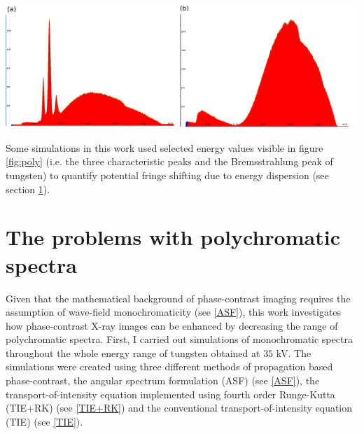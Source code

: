 \documentclass[10pt, a4paper, singlespacing]{report}
\newenvironment{Figure}
    {\par\medskip\noindent\minipage{\linewidth}}
    {\endminipage\par\medskip}
\begin{document}
\begin{Figure}
\centering
\includegraphics[width=\linewidth]{W_poly_spectrum.pdf}
\label{fig:poly}
\end{Figure}

Some simulations in this work used selected energy values visible in figure \ref{fig:poly} (i.e. the three characteristic peaks and the Bremsstrahlung peak of tungsten) to quantify potential fringe shifting due to energy dispersion (see section \ref{poly}).

\section{The problems with polychromatic spectra}\label{poly}

Given that the mathematical background of phase-contrast imaging requires the assumption of wave-field monochromaticity (see \ref{ASF}), this work investigates how phase-contrast X-ray images can be enhanced by decreasing the range of polychromatic spectra. 
First, I carried out simulations of monochromatic spectra throughout the whole energy range of tungsten obtained at $35$ kV. The simulations were created using three different methods of propagation based phase-contrast, the angular spectrum formulation (ASF) (see \ref{ASF}), the transport-of-intensity equation implemented using fourth order Runge-Kutta (TIE+RK) (see \ref{TIE+RK}) and the conventional transport-of-intensity equation (TIE) (see \ref{TIE}).
\end{document}
